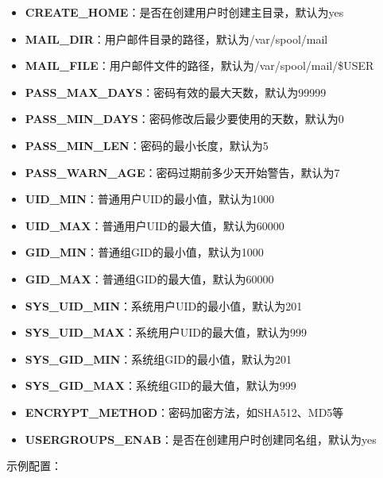 \documentclass[12pt,UTF8]{ctexbook}
\begin{document}
\begin{itemize}
    \item \textbf{CREATE\_HOME}：是否在创建用户时创建主目录，默认为yes
    \item \textbf{MAIL\_DIR}：用户邮件目录的路径，默认为/var/spool/mail
    \item \textbf{MAIL\_FILE}：用户邮件文件的路径，默认为/var/spool/mail/\$USER
    \item \textbf{PASS\_MAX\_DAYS}：密码有效的最大天数，默认为99999
    \item \textbf{PASS\_MIN\_DAYS}：密码修改后最少要使用的天数，默认为0
    \item \textbf{PASS\_MIN\_LEN}：密码的最小长度，默认为5
    \item \textbf{PASS\_WARN\_AGE}：密码过期前多少天开始警告，默认为7
    \item \textbf{UID\_MIN}：普通用户UID的最小值，默认为1000
    \item \textbf{UID\_MAX}：普通用户UID的最大值，默认为60000
    \item \textbf{GID\_MIN}：普通组GID的最小值，默认为1000
    \item \textbf{GID\_MAX}：普通组GID的最大值，默认为60000
    \item \textbf{SYS\_UID\_MIN}：系统用户UID的最小值，默认为201
    \item \textbf{SYS\_UID\_MAX}：系统用户UID的最大值，默认为999
    \item \textbf{SYS\_GID\_MIN}：系统组GID的最小值，默认为201
    \item \textbf{SYS\_GID\_MAX}：系统组GID的最大值，默认为999
    \item \textbf{ENCRYPT\_METHOD}：密码加密方法，如SHA512、MD5等
    \item \textbf{USERGROUPS\_ENAB}：是否在创建用户时创建同名组，默认为yes
\end{itemize}

示例配置：
\end{document}
